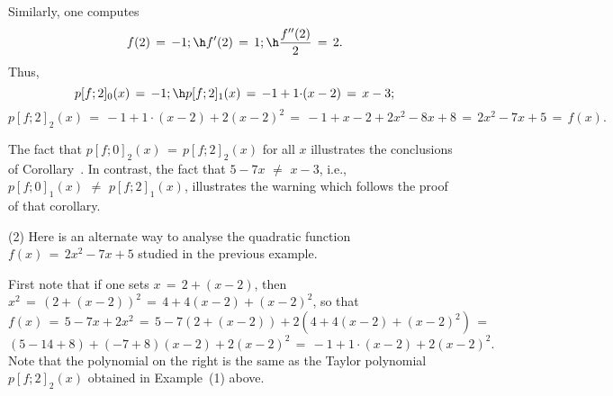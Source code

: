{        Similarly, one computes
        \begin{displaymath}
        f(2) \,=\, -1; \h f'(2) \,=\, 1; \h \frac{f''(2)}{2} \,=\, 2.
        \end{displaymath}
    Thus,
        \begin{displaymath}
        p[f;2]_{0}(x) \,=\, -1; \h p[f;2]_{1}(x) \,=\, -1 + 1{\cdot}(x-2) \,=\, x-3;
        \end{displaymath}
        \begin{displaymath}
        p[f;2]_{2}(x) \,=\, -1 + 1{\cdot}(x-2) + 2(x-2)^{2} \,=\, -1 + x -2 +2x^{2}-8x+8 \,=\, 2x^{2} - 7x + 5 \,=\, f(x).
        \end{displaymath}

        The fact that $p[f;0]_{2}(x) \,=\, p[f;2]_{2}(x)$ for all $x$ illustrates the conclusions of Corollary~.
    In contrast, the fact that $5-7x \,\,{\neq}\,\, x-3$, i.e., $p[f;0]_{1}(x) \,\,{\neq}\,\, p[f;2]_{1}(x)$,
    illustrates the warning  which follows the proof of that corollary.

\V

        (2) Here is an alternate way to analyse the quadratic function $f(x) \,=\, 2x^{2}-7x+5$ studied in the previous example.

        First note that if one sets $x \,=\, 2+(x-2)$, then $x^{2} \,=\, (2+(x-2))^{2} \,=\, 4+4(x-2)+(x-2)^{2}$, so that
        \begin{displaymath}
        f(x) \,=\, 5-7x+2x^{2} \,=\, 5-7(2+(x-2))+2(4+4(x-2)+(x-2)^{2}) \,=\, 
        \end{displaymath}
        \begin{displaymath}
    (5-14+8) + (-7+8)(x-2) + 2(x-2)^{2} \,=\, -1 + 1{\cdot}(x-2) + 2(x-2)^{2}.
        \end{displaymath}
    Note that the polynomial on the right is the same as the Taylor polynomial $p[f;2]_{2}(x)$ obtained in Example~(1) above.

}
